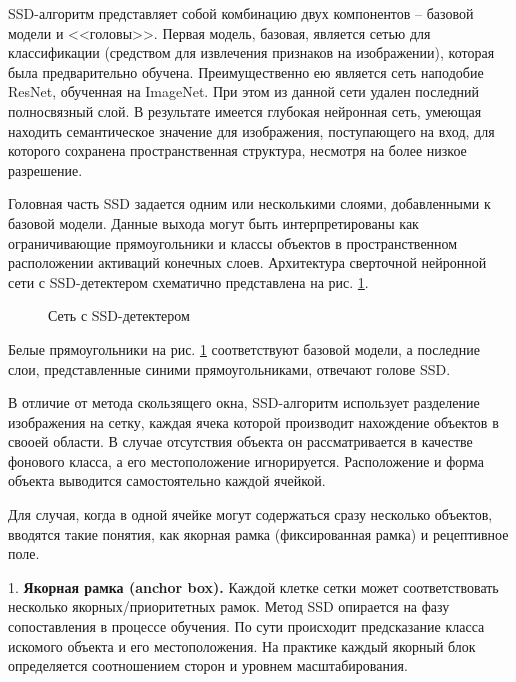 \documentclass[14pt,a4paper]{extarticle}
\begin{document}
SSD-алгоритм представляет собой комбинацию двух компонентов -- базовой модели и <<головы>>. Первая модель, базовая, является сетью для классификации (средством для извлечения признаков на изображении), которая была предварительно обучена. Преимущественно ею является сеть наподобие ResNet, обученная на ImageNet. При этом из данной сети удален последний полносвязный слой. В результате имеется глубокая нейронная сеть, умеющая находить семантическое значение для изображения, поступающего на вход, для которого сохранена пространственная структура, несмотря на более низкое разрешение. 

Головная часть SSD задается одним или несколькими слоями, добавленными к базовой модели. Данные выхода могут быть интерпретированы как ограничивающие прямоугольники и классы объектов в пространственном расположении активаций конечных слоев. Архитектура сверточной нейронной сети с SSD-детектером схематично представлена на рис. \ref{ssd_fig_lbl}.
\begin{figure}[h]
\caption{Сеть с SSD-детектером}
\label{ssd_fig_lbl}
\end{figure}  

Белые прямоугольники на рис. \ref{ssd_fig_lbl} соответствуют базовой модели, а последние слои, представленные синими прямоугольниками, отвечают голове SSD. 

В отличие от метода скользящего окна, SSD-алгоритм использует разделение изображения на сетку, каждая ячека которой производит нахождение объектов в свооей области. В случае отсутствия объекта он рассматривается в качестве фонового класса, а его местоположение игнорируется. Расположение и форма объекта выводится самостоятельно каждой ячейкой. 

Для случая, когда в одной ячейке могут содержаться сразу несколько объектов, вводятся такие понятия, как якорная рамка (фиксированная рамка) и рецептивное поле.

1. \textbf{Якорная рамка (anchor box).} Каждой клетке сетки может соответствовать несколько якорных/приоритетных рамок. Метод SSD опирается на фазу сопоставления в процессе обучения. По сути происходит предсказание класса искомого объекта и его местоположения. На практике каждый якорный блок определяется соотношением сторон и уровнем масштабирования. 
\end{document}
